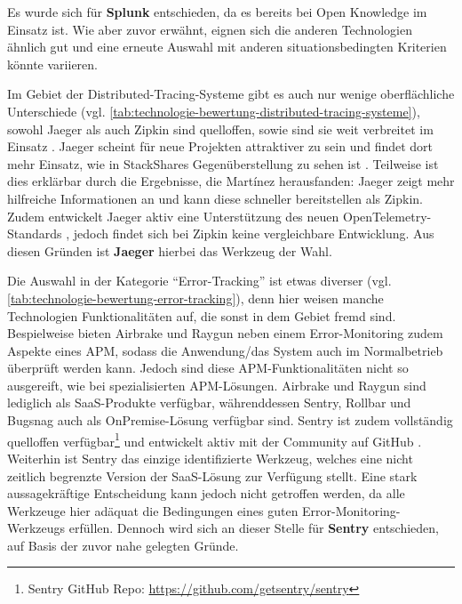 Es wurde sich für \textbf{Splunk} entschieden, da es bereits bei Open Knowledge im Einsatz ist. Wie aber zuvor erwähnt, eignen sich die anderen Technologien ähnlich gut und eine erneute Auswahl mit anderen situationsbedingten Kriterien könnte variieren.



Im Gebiet der Distributed-Tracing-Systeme gibt es auch nur wenige oberflächliche Unterschiede (vgl. \autoref{tab:technologie-bewertung-distributed-tracing-systeme}), sowohl Jaeger als auch Zipkin sind quelloffen, sowie sind sie weit verbreitet im Einsatz \cite{AnalysisOfDistributedTracingSystemsEffectOnPerformance}. Jaeger scheint für neue Projekten attraktiver zu sein und findet dort mehr Einsatz, wie in StackShares Gegenüberstellung zu sehen ist \cite{StackShareJaegerVsZipkin}. Teilweise ist dies erklärbar durch die Ergebnisse, die Mart{\'i}nez \etal \cite{ComparisonOfE2ETestingToolsForMicroservices} herausfanden: Jaeger zeigt mehr hilfreiche Informationen an und kann diese schneller bereitstellen als Zipkin. Zudem entwickelt Jaeger aktiv eine Unterstützung des neuen OpenTelemetry-Standards \cite{JaegerOpenTelemetry}, jedoch findet sich bei Zipkin keine vergleichbare Entwicklung. Aus diesen Gründen ist \textbf{Jaeger} hierbei das Werkzeug der Wahl.



Die Auswahl in der Kategorie \enquote{Error-Tracking} ist etwas diverser (vgl. \autoref{tab:technologie-bewertung-error-tracking}), denn hier weisen manche Technologien Funktionalitäten auf, die sonst in dem Gebiet fremd sind. Bespielweise bieten Airbrake und Raygun neben einem Error-Monitoring zudem Aspekte eines APM, sodass die Anwendung/das System auch im Normalbetrieb überprüft werden kann. Jedoch sind diese APM-Funktionalitäten nicht so ausgereift, wie bei spezialisierten APM-Lösungen. Airbrake und Raygun sind lediglich als SaaS-Produkte verfügbar, währenddessen Sentry, Rollbar und Bugsnag auch als OnPremise-Lösung verfügbar sind. Sentry ist zudem vollständig quelloffen verfügbar\footnote{Sentry GitHub Repo: \url{https://github.com/getsentry/sentry}} und entwickelt aktiv mit der Community auf GitHub \cite{GitHub}. Weiterhin ist Sentry das einzige identifizierte Werkzeug, welches eine nicht zeitlich begrenzte Version der SaaS-Lösung zur Verfügung stellt. Eine stark aussagekräftige Entscheidung kann jedoch nicht getroffen werden, da alle Werkzeuge hier adäquat die Bedingungen eines guten Error-Monitoring-Werkzeugs erfüllen. Dennoch wird sich an dieser Stelle für \textbf{Sentry} entschieden, auf Basis der zuvor nahe gelegten Gründe.

